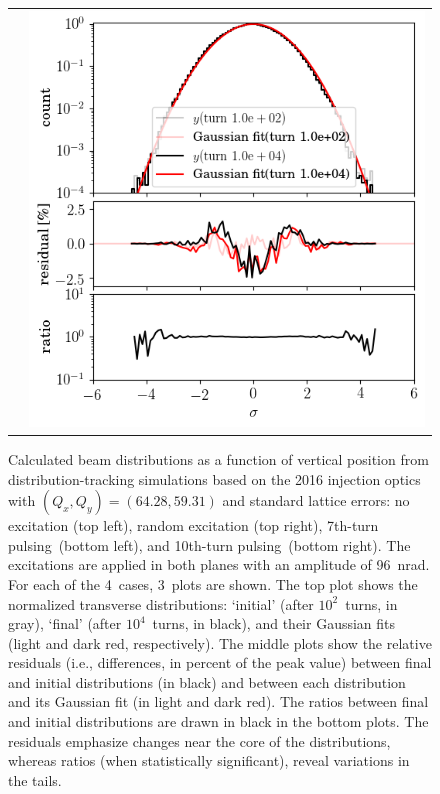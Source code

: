 \documentclass[%
 reprint,
 amsmath,amssymb,
 aps,
prstab,
longbibliography
]{revtex4-1}
\newcommand{\seventhtp}{7th-turn pulsing}
\newcommand{\tenthtp}{10th-turn pulsing}
\newlength{\halfwidth}
\begin{document}
\begin{figure}
\begin{tabular}{cc}
                  &
    \includegraphics[width=\halfwidth]{2016injerra2b2u_t10skhv_3_5um_hist_y.png} \\
  \end{tabular}
  \caption{Calculated beam distributions as a function of vertical
    position from distribution-tracking simulations based on the 2016
    injection optics with $(Q_x, Q_y) = (64.28, 59.31)$ and standard
    lattice errors: no excitation (top left), random excitation (top
    right), \seventhtp\ (bottom left), and
    \tenthtp\ (bottom right). The excitations
    are applied in both planes with an amplitude of 96~nrad. For each
    of the 4~cases, 3~plots are shown. The top plot shows the
    normalized transverse distributions: `initial' (after
    $10^2$~turns, in gray), `final' (after $10^4$~turns, in black),
    and their Gaussian fits (light and dark red, respectively). The
    middle plots show the relative residuals (i.e., differences, in
    percent of the peak value) between final and initial distributions
    (in black) and between each distribution and its Gaussian fit (in
    light and dark red). The ratios between final and initial
    distributions are drawn in black in the bottom plots. The
    residuals emphasize changes near the core of the distributions,
    whereas ratios (when statistically significant), reveal variations
    in the tails.}
  \label{fig:patternhist}
\end{figure}
\end{document}
